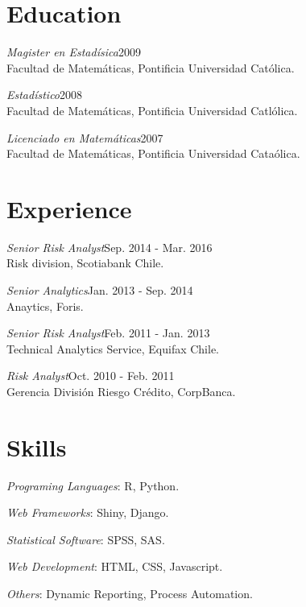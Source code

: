 \documentclass[margin]{res}
\begin{document}
\begin{resume}

\section{Education}

    {\sl Magister en Estadísica}\hfill 2009\\
    Facultad de Matemáticas, Pontificia Universidad Católica.

    {\sl Estadístico}\hfill 2008\\
    Facultad de Matemáticas, Pontificia Universidad Catlólica.

    {\sl Licenciado en Matemáticas}\hfill 2007\\
    Facultad de Matemáticas, Pontificia Universidad Cataólica.

\vspace{1cm}

\section{Experience}

    {\sl Senior Risk Analyst}\hfill Sep. 2014 - Mar. 2016\\
        Risk division, Scotiabank Chile.

    {\sl Senior Analytics}\hfill Jan. 2013 - Sep. 2014\\
    Anaytics, Foris.

    {\sl Senior Risk Analyst}\hfill Feb. 2011 - Jan. 2013\\
    Technical Analytics Service, Equifax Chile.

    {\sl Risk Analyst}\hfill Oct. 2010 - Feb. 2011\\
    Gerencia División Riesgo Crédito, CorpBanca.

\vspace{1cm}

\section{Skills}

    {\sl Programing Languages}: R, Python.

    {\sl Web Frameworks}: Shiny, Django.

    {\sl Statistical Software}: SPSS, SAS.
    
    {\sl Web Development}: HTML, CSS, Javascript.
    
    {\sl Others}: Dynamic Reporting, Process Automation.


\end{resume}
\end{document}
